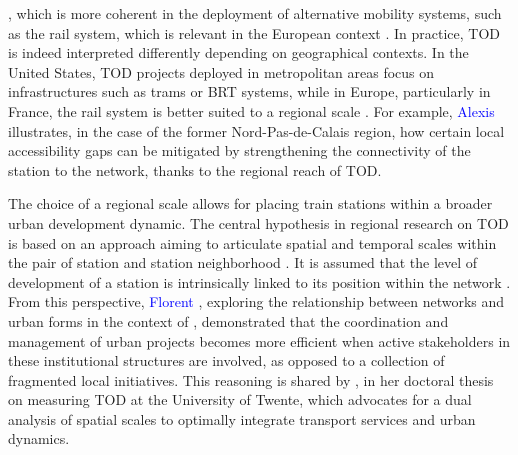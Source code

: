 \begin{refsegment}
{}, which is more coherent in the deployment of alternative mobility systems, such as the rail system, which is relevant in the European context \textcolor{blue}{\autocite[212]{bertolini_sustainable_2005}}. In practice, \acrshort{TOD} is indeed interpreted differently depending on geographical contexts. In the United States, \acrshort{TOD} projects deployed in metropolitan areas focus on  infrastructures such as trams or \acrfull{BRT} systems, while in Europe, particularly in France, the rail system is better suited to a regional scale \textcolor{blue}{\autocite[95]{bonin_evaluation_2015}}. For example, \textcolor{blue}{Alexis} \textcolor{blue}{\textcite[132]{conesa_accessibility_2018}} illustrates, in the case of the former Nord-Pas-de-Calais region, how certain local accessibility gaps can be mitigated by strengthening the connectivity of the station to the network, thanks to the regional reach of \acrshort{TOD}.%

The choice of a regional scale allows for placing train stations within a broader urban development dynamic. The central hypothesis in regional research on \acrshort{TOD} is based on an approach aiming to articulate spatial and temporal scales within the pair of station and station neighborhood \textcolor{blue}{\autocite[14]{menerault_gares_2001}}. It is assumed that the level of development of a station is intrinsically linked to its position within the network \textcolor{blue}{\autocite[344]{bertolini_nodes_1996}}. From this perspective, \textcolor{blue}{Florent} \textcolor{blue}{\textcite[5]{le_nechet_modelling_2019}}, exploring the relationship between networks and urban forms in the context of , demonstrated that the coordination and management of urban projects becomes more efficient when active stakeholders in these institutional structures are involved, as opposed to a collection of fragmented local initiatives. This reasoning is shared by \textcolor{blue}{\textcite[55, 111]{singh_measuring_2015}}, in her doctoral thesis on measuring \acrshort{TOD} at the University of Twente, which advocates for a dual analysis of spatial scales to optimally integrate transport services and urban dynamics.%


\end{refsegment}
